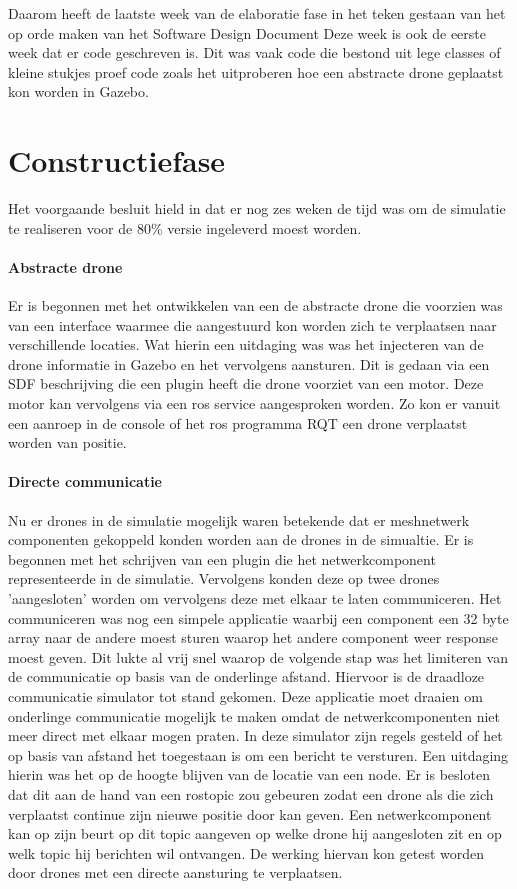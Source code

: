 \documentclass[a4paper, 11pt, oneside]{report}
\begin{document}
Daarom heeft de laatste week van de elaboratie fase in het teken gestaan van het op orde maken van het Software Design Document
Deze week is ook de eerste week dat er code geschreven is. 
Dit was vaak code die bestond uit lege classes of kleine stukjes proef code zoals het uitproberen hoe een abstracte drone geplaatst kon worden in Gazebo.

\section{Constructiefase}\label{sec:constructiefase}
Het voorgaande besluit hield in dat er nog zes weken de tijd was om de simulatie te realiseren voor de 80\% versie ingeleverd moest worden.
\paragraph{Abstracte drone}
Er is begonnen met het ontwikkelen van een de abstracte drone die voorzien was van een interface waarmee die aangestuurd kon worden zich te verplaatsen naar verschillende locaties. Wat hierin een uitdaging was was het injecteren van de drone informatie in Gazebo en het vervolgens aansturen. Dit is gedaan via een SDF beschrijving die een plugin heeft die drone voorziet van een motor. Deze motor kan vervolgens via een ros service aangesproken worden. Zo kon er vanuit een aanroep in de console of het ros programma RQT een drone verplaatst worden van positie. 
\paragraph{Directe communicatie}
Nu er drones in de simulatie mogelijk waren betekende dat er meshnetwerk componenten gekoppeld konden worden aan de drones in de simualtie.
Er is begonnen met het schrijven van een plugin die het netwerkcomponent representeerde in de simulatie. 
Vervolgens konden deze op twee drones 'aangesloten' worden om vervolgens deze met elkaar te laten communiceren.
Het communiceren was nog een simpele applicatie waarbij een component een 32 byte array naar de andere moest sturen waarop het andere component weer response moest geven.
Dit lukte al vrij snel waarop de volgende stap was het limiteren van de communicatie op basis van de onderlinge afstand.
Hiervoor is de draadloze communicatie simulator tot stand gekomen. 
Deze applicatie moet draaien om onderlinge communicatie mogelijk te maken omdat de netwerkcomponenten niet meer direct met elkaar mogen praten.
In deze simulator zijn regels gesteld of het op basis van afstand het toegestaan is om een bericht te versturen.
Een uitdaging hierin was het op de hoogte blijven van de locatie van een node. 
Er is besloten dat dit aan de hand van een rostopic zou gebeuren zodat een drone als die zich verplaatst continue zijn nieuwe positie door kan geven. Een netwerkcomponent kan op zijn beurt op dit topic aangeven op welke drone hij aangesloten zit en op welk topic hij berichten wil ontvangen. De werking hiervan kon getest worden door drones met een directe aansturing te verplaatsen.
\end{document}
